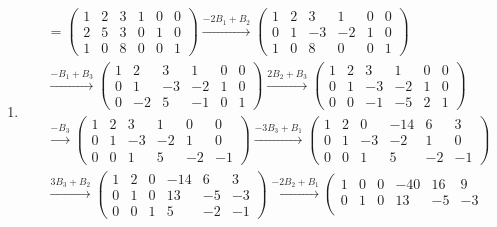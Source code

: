 \documentclass[11pt,a4paper]{article}
\begin{document}
\begin{enumerate}
\item
\begin{align*}
    [A\mid I_3]&=
    \left(\begin{array}{ccc|ccc}
        1&2&3&1&0&0\\
        2&5&3&0&1&0\\
        1&0&8&0&0&1
    \end{array}\right)
    \xrightarrow{-2B_1+B_2}
    \left(\begin{array}{ccc|ccc}
        1&2&3&1&0&0\\
        0&1&-3&-2&1&0\\
        1&0&8&0&0&1
    \end{array}\right)
    \\[1em]
    &\xrightarrow{-B_1+B_3}
    \left(\begin{array}{ccc|ccc}
        1&2&3&1&0&0\\
        0&1&-3&-2&1&0\\
        0&-2&5&-1&0&1
    \end{array}\right)
    \xrightarrow{2B_2+B_3}
    \left(\begin{array}{ccc|ccc}
        1&2&3&1&0&0\\
        0&1&-3&-2&1&0\\
        0&0&-1&-5&2&1
    \end{array}\right)
    \\[1em]
    &\xrightarrow{-B_3}
    \left(\begin{array}{ccc|ccc}
        1&2&3&1&0&0\\
        0&1&-3&-2&1&0\\
        0&0&1&5&-2&-1
    \end{array}\right)
    \xrightarrow{-3B_3+B_1}
    \left(\begin{array}{ccc|ccc}
        1&2&0&-14&6&3\\
        0&1&-3&-2&1&0\\
        0&0&1&5&-2&-1
    \end{array}\right)
    \\[1em]
    &\xrightarrow{3B_3+B_2}
    \left(\begin{array}{ccc|ccc}
        1&2&0&-14&6&3\\
        0&1&0&13&-5&-3\\
        0&0&1&5&-2&-1
    \end{array}\right)
    \xrightarrow{-2B_2+B_1}
    \left(\begin{array}{ccc|ccc}
        1&0&0&-40&16&9\\
        0&1&0&13&-5&-3\\

\end{array}
\end{align*}
\end{enumerate}
\end{document}
